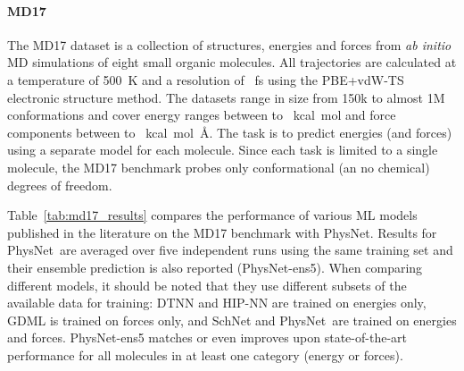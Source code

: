 \documentclass[12pt]{article}
\newcommand{\nn}{PhysNet}
\begin{document}
\paragraph{MD17}
The MD17 dataset\cite{chmiela2017machine} is a collection of
structures, energies and forces from \textit{ab initio} MD simulations
of eight small organic molecules. All trajectories are calculated at a
temperature of \num{500}~K and a resolution of ~fs using the
PBE+vdW-TS\cite{perdew1996generalized, tkatchenko2009accurate}
electronic structure method. The datasets range in size from 150k to
almost 1M conformations and cover energy ranges between  to
~kcal~mol and force components between  to
~kcal~mol~\AA. The task is to predict energies (and
forces) using a separate model for each molecule. Since each task is
limited to a single molecule, the MD17 benchmark probes only
conformational (an no chemical) degrees of freedom.

Table~\ref{tab:md17_results} compares the performance of various ML
models published in the literature on the MD17 benchmark with
\nn. Results for \nn\ are averaged over five independent runs using
the same training set and their ensemble
prediction\cite{breiman1996bagging} is also reported (\nn-ens5). When
comparing different models, it should be noted that they use different
subsets of the available data for training:
DTNN\cite{schutt2017quantum} and HIP-NN\cite{lubbers2018hierarchical}
are trained on energies only, GDML\cite{chmiela2017machine} is trained
on forces only, and SchNet and \nn\ are trained on energies and
forces.\cite{schutt2017schnet} \nn-ens5 matches or even improves upon
state-of-the-art performance for all molecules in at least one
category (energy or forces).
\end{document}

